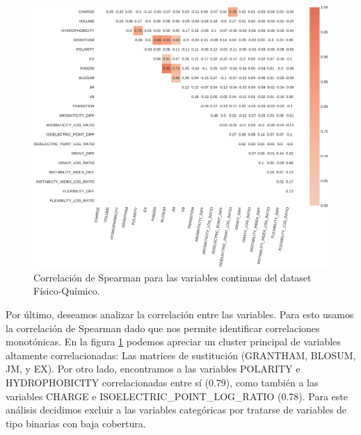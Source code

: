 \newpage

\begin{figure}[H]
    \centering
    \includegraphics[scale=0.25]{documents/latex/figures/3/structural/structural_corr.pdf}
    \caption{Correlación de Spearman para las variables continuas del dataset Físico-Químico.}
    \label{fig:corrplot_structural}
\end{figure}

Por último, deseamos analizar la correlación entre las variables. Para esto usamos la correlación de Spearman dado que nos permite identificar correlaciones monotónicas. En la figura \ref{fig:corrplot_structural} podemos apreciar un cluster principal de variables altamente correlacionadas: Las matrices de sustitución (GRANTHAM, BLOSUM, JM, y EX). Por otro lado, encontramos a las variables POLARITY e HYDROPHOBICITY correlacionadas entre sí (0.79), como también a las variables CHARGE e ISOELECTRIC\_POINT\_LOG\_RATIO (0.78). Para este análisis decidimos excluir a las variables categóricas por tratarse de variables de tipo binarias con baja cobertura. 



